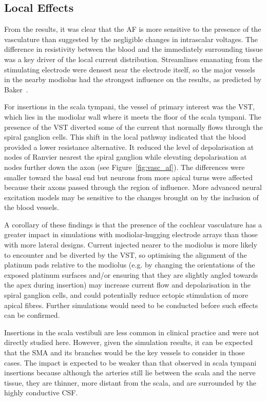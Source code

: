 \subsection{Local Effects}

From the results, it was clear that the AF is more sensitive to the presence of
the vasculature than suggested by the negligible changes in intrascalar
voltages. The difference in resistivity between the blood and the immediately
surrounding tissue was a key driver of the local current distribution.
Streamlines emanating from the stimulating electrode were densest near the
electrode itself, so the major vessels in the nearby modiolus had the strongest
influence on the results, as predicted by Baker~\cite{baker1989}.

For insertions in the scala tympani, the vessel of primary interest was the VST,
which lies in the modiolar wall where it meets the floor of the scala tympani.
The presence of the VST diverted some of the current that normally flows through
the spiral ganglion cells. This shift in the local pathway indicated that the
blood provided a lower resistance alternative. It reduced the level of
depolarisation at nodes of Ranvier nearest the spiral ganglion while elevating
depolarisation at nodes further down the axon (see Figure~\ref{fig:vasc_af}).
The differences were smaller toward the basal end but neurons from more apical
turns were affected because their axons passed through the region of influence.
More advanced neural excitation models may be sensitive to the changes brought
on by the inclusion of the blood vessels.

A corollary of these findings is that the presence of the cochlear vasculature
has a greater impact in simulations with modiolar-hugging electrode arrays than
those with more lateral designs. Current injected nearer to the modiolus is more
likely to encounter and be diverted by the VST, so optimising the alignment of
the platinum pads relative to the modiolus (e.g. by changing the orientations of
the exposed platinum surfaces and/or ensuring that they are slightly angled
towards the apex during insertion) may increase current flow and depolarisation
in the spiral ganglion cells, and could potentially reduce ectopic stimulation
of more apical fibres. Further simulations would need to be conducted before
such effects can be confirmed.

Insertions in the scala vestibuli are less common in clinical practice and were
not directly studied here. However, given the simulation results, it can be
expected that the SMA and its branches would be the key vessels to consider in
those cases. The impact is expected to be weaker than that observed in scala
tympani insertions because although the arteries still lie between the scala and
the nerve tissue, they are thinner, more distant from the scala, and are
surrounded by the highly conductive CSF.

